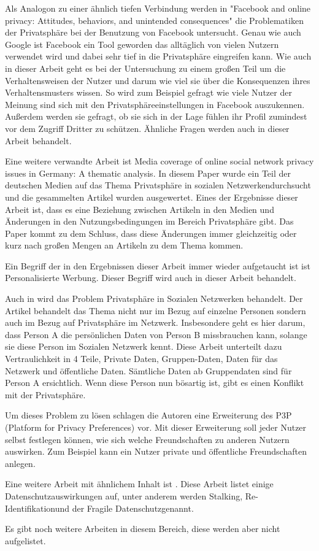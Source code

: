 Als Analogon zu einer ähnlich tiefen Verbindung werden in "Facebook and online privacy: Attitudes, behaviors, and unintended consequences" \cite{debatin2009facebook} die Problematiken der Privatsphäre bei der Benutzung von Facebook untersucht. Genau wie auch Google ist Facebook ein Tool geworden das alltäglich von vielen Nutzern verwendet wird und dabei sehr tief in die Privatsphäre eingreifen kann. Wie auch in dieser Arbeit geht es bei der Untersuchung zu einem großen Teil um die Verhaltensweisen der Nutzer und darum wie viel sie über die Konsequenzen ihres Verhaltensmusters wissen. So wird zum Beispiel gefragt wie viele Nutzer der Meinung sind sich mit den Privatsphäreeinstellungen in Facebook auszukennen. Außerdem werden sie gefragt, ob sie sich in der Lage fühlen ihr Profil zumindest vor dem Zugriff Dritter zu schützen. Ähnliche Fragen werden auch in dieser Arbeit behandelt.

Eine weitere verwandte Arbeit ist \glqq Media coverage of online social network privacy issues in Germany: A thematic analysis\grqq \cite{rizk2009media}. In diesem Paper wurde ein Teil der deutschen Medien auf das Thema \glqq Privatsphäre in sozialen Netzwerken\grqq durchsucht und die gesammelten Artikel wurden ausgewertet. Eines der Ergebnisse dieser Arbeit ist, dass es eine Beziehung zwischen Artikeln in den Medien und Änderungen in den Nutzungsbedingungen im Bereich Privatsphäre gibt. Das Paper kommt zu dem Schluss, dass diese Änderungen immer gleichzeitig oder kurz nach großen Mengen an Artikeln zu dem Thema kommen.

Ein Begriff der in den Ergebnissen dieser Arbeit immer wieder aufgetaucht ist ist \glqq Personalisierte Werbung\grqq . Dieser Begriff wird auch in dieser Arbeit behandelt.

Auch in \cite{Preibusch2007Ubiquitous} wird das Problem Privatsphäre in Sozialen Netzwerken behandelt. Der Artikel behandelt das Thema nicht nur im Bezug auf einzelne Personen sondern auch im Bezug auf Privatsphäre im Netzwerk. Insbesondere geht es hier darum, dass Person A die persönlichen Daten von Person B missbrauchen kann, solange sie diese Person im Sozialen Netzwerk kennt. Diese Arbeit unterteilt dazu Vertraulichkeit in 4 Teile, Private Daten, Gruppen-Daten, Daten für das Netzwerk und öffentliche Daten. Sämtliche Daten ab \glqq Gruppendaten \grqq sind für Person A ersichtlich. Wenn diese Person nun bösartig ist, gibt es einen Konflikt mit der Privatsphäre. 

Um dieses Problem zu lösen schlagen die Autoren eine Erweiterung des P3P (Platform for Privacy Preferences) vor. Mit dieser Erweiterung soll jeder Nutzer selbst festlegen können, wie sich welche Freundschaften zu anderen Nutzern auswirken. Zum Beispiel kann ein Nutzer private und öffentliche Freundschaften anlegen.

Eine weitere Arbeit mit ähnlichem Inhalt ist \cite{gross2005information}. Diese Arbeit listet einige Datenschutzauswirkungen auf, unter anderem werden \glqq Stalking\grqq , \glqq Re-Identifikation\grqq und der \glqq Fragile Datenschutz\grqq genannt.


Es gibt noch weitere Arbeiten in diesem Bereich, diese werden aber nicht aufgelistet.